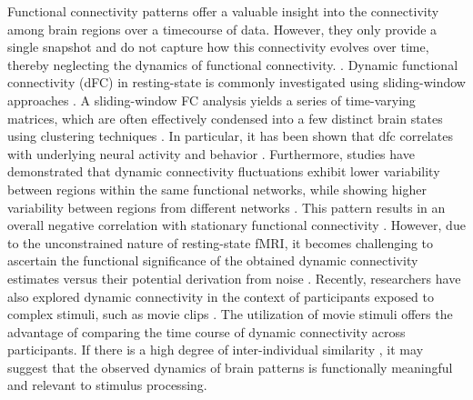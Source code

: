 Functional connectivity patterns offer a valuable insight into the connectivity
among brain regions over a timecourse of data. However, they only provide a
single snapshot and do not capture how this connectivity evolves over time,
thereby neglecting the dynamics of functional connectivity.
\citep{Allen2012TrackingWholeBrain,Di2020Intersubjectconsistentdynamic,Hutchison2013Dynamicfunctionalconnectivity}.
Dynamic functional connectivity (dFC) in resting-state is commonly investigated
using sliding-window approaches
\citep{Allen2012TrackingWholeBrain,Hutchison2013Dynamicfunctionalconnectivity,Preti2017dynamicfunctionalconnectome,Lurie2020Questionscontroversiesstudy}.
A sliding-window FC analysis yields a series of time-varying matrices, which are
often effectively condensed into a few distinct brain states using clustering
techniques \citep{Hutchison2013Dynamicfunctionalconnectivity}. In particular, it
has been shown that \acrshort*{dfc} correlates with underlying neural activity
\citep{Tagliazucchi2012Criticalitylargescale,Thompson2013Neuralcorrelatestime,Keilholz2014NeuralBasisTime}
and behavior \citep{Liegeois2019Restingbraindynamics}. Furthermore, studies have
demonstrated that dynamic connectivity fluctuations exhibit lower variability
between regions within the same functional networks, while showing higher
variability between regions from different networks
\citep{Fu2017AssociationsFunctionalConnectivity}. This pattern results in an
overall negative correlation with stationary functional connectivity
\citep{Thompson2015meanvariancerelationshipreveals,Zhang2018Testretestreliability}.
However, due to the unconstrained nature of resting-state fMRI, it becomes
challenging to ascertain the functional significance of the obtained dynamic
connectivity estimates versus their potential derivation from noise
\citep{Lindquist2014Evaluatingdynamicbivariate}. Recently, researchers have also
explored dynamic connectivity in the context of participants exposed to complex
stimuli, such as movie clips \citep{Di2020Intersubjectconsistentdynamic}. The
utilization of movie stimuli offers the advantage of comparing the time course
of dynamic connectivity across participants. If there is a high degree of
inter-individual similarity
\citep{Hasson2004IntersubjectSynchronizationCortical,Nastase2019Measuringsharedresponses},
it may suggest that the observed dynamics of brain patterns is functionally
meaningful and relevant to stimulus processing.


